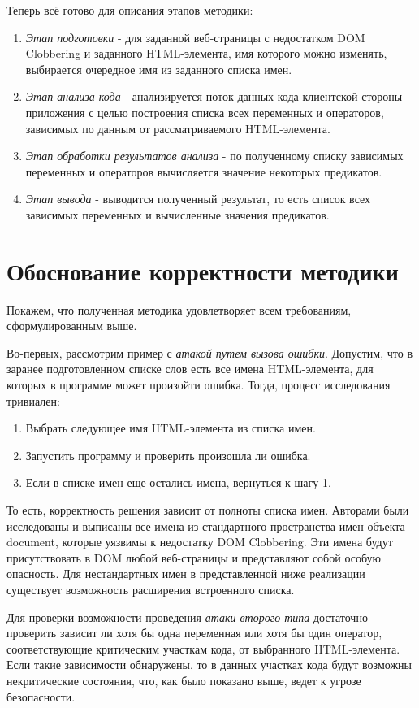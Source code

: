 Теперь всё готово для описания этапов методики:
\begin{enumerate}
	\item \textit{Этап подготовки} - для заданной веб-страницы с недостатком DOM Clob\-bering и заданного HTML-элемента, имя которого можно изменять, выбирается очередное имя из заданного списка имен.
	\item \textit{Этап анализа кода} - анализируется поток данных кода клиентской стороны приложения с целью построения списка всех переменных и операторов, зависимых по данным от рассматриваемого HTML-элемента.
	\item \textit{Этап обработки результатов анализа} - по полученному списку зависимых переменных и операторов вычисляется значение некоторых предикатов.
	\item \textit{Этап вывода} - выводится полученный результат, то есть список всех зависимых переменных и вычисленные значения предикатов.
\end{enumerate}
\bigskip

\section{Обоснование корректности методики}
Покажем, что полученная методика удовлетворяет всем требованиям, сформулированным выше.


Во-первых, рассмотрим пример с \textit{атакой путем вызова ошибки}. Допустим, что в заранее подготовленном списке слов есть все имена HTML-элемента, для которых в программе может произойти ошибка. Тогда, процесс исследования тривиален: 
\begin{enumerate}
	\item Выбрать следующее имя HTML-элемента из списка имен.
	\item Запустить программу и проверить произошла ли ошибка.
	\item Если в списке имен еще остались имена, вернуться к шагу 1.
\end{enumerate}
То есть, корректность решения зависит от полноты списка имен. Авторами были исследованы и выписаны все имена из стандартного пространства имен объекта document, которые уязвимы к недостатку DOM Clobbering. Эти имена будут присутствовать в DOM любой веб-страницы и представляют собой особую опасность. Для нестандартных имен в представленной ниже реализации существует возможность расширения встроенного списка.

\bigskip
Для проверки возможности проведения \textit{атаки второго типа} достаточно проверить зависит ли хотя бы одна переменная или хотя бы один оператор, соответствующие критическим участкам кода, от выбранного HTML-элемента. Если такие зависимости обнаружены, то в данных участках кода будут возможны некритические состояния, что, как было показано выше, ведет к угрозе безопасности.

